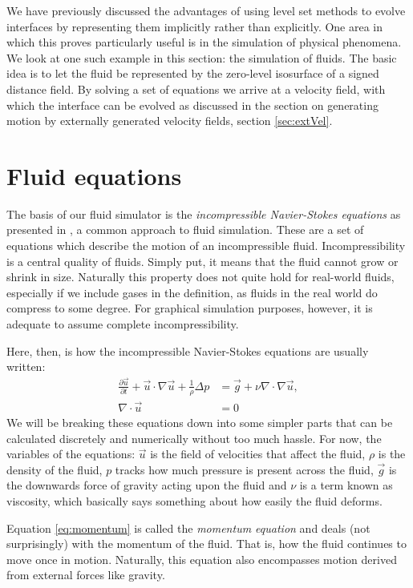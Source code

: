 We have previously discussed the advantages of using level set methods
to evolve interfaces by representing them implicitly rather than
explicitly. One area in which this proves particularly useful is in
the simulation of physical phenomena. We look at one such example in
this section: the simulation of fluids.  The basic idea is to let the
fluid be represented by the zero-level isosurface of a signed distance
field. By solving a set of equations we arrive at a velocity field,
with which the interface can be evolved as discussed in the section on
generating motion by externally generated velocity fields, section
\vref{sec:extVel}.

\section{Fluid equations}
The basis of our fluid simulator is the \emph{incompressible
  Navier-Stokes equations} as presented in , a
common approach to fluid simulation. These are a set of equations
which describe the motion of an incompressible
fluid. Incompressibility is a central quality of fluids. Simply put,
it means that the fluid cannot grow or shrink in size. Naturally this
property does not quite hold for real-world fluids, especially if we
include gases in the definition, as fluids in the real world do
compress to some degree. For graphical simulation purposes, however,
it is adequate to assume complete incompressibility.


Here, then, is how the incompressible Navier-Stokes equations are usually written:
\begin{align}
  \label{eq:momentum}
  \frac{\partial\vec{u}}{\partial t}+\vec{u} \cdot \nabla\vec{u} + \frac{1}{\rho}\Delta p &= \vec{g}+\nu\nabla\cdot\nabla\vec{u},\\
  \label{eq:incomp}
  \nabla\cdot\vec{u}&=0
\end{align}
We will be breaking these equations down into some simpler parts that
can be calculated discretely and numerically without too much
hassle. For now, the variables of the equations: $\vec u$ is the field
of velocities that affect the fluid, $\rho$ is the density of the
fluid, $p$ tracks how much pressure is present across the fluid,
$\vec{g}$ is the downwards force of gravity acting upon the fluid and
$\nu$ is a term known as viscosity, which basically says something
about how easily the fluid deforms.

Equation \vref{eq:momentum} is called the \emph{momentum equation} and
deals (not surprisingly) with the momentum of the fluid. That is, how
the fluid continues to move once in motion. Naturally, this equation
also encompasses motion derived from external forces like gravity.

